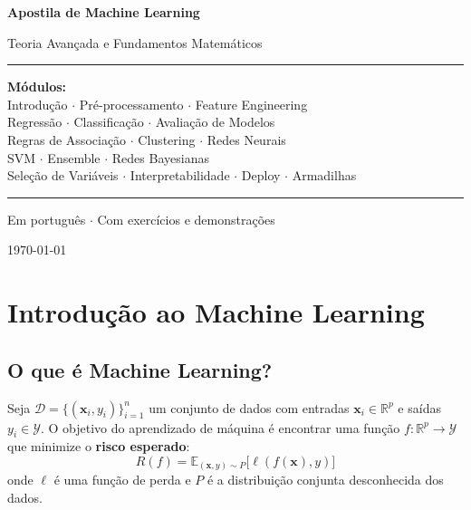 \documentclass[12pt,a4paper,twoside]{book}
\theoremstyle{definition}
\theoremstyle{remark}
\newcommand{\R}{\mathbb{R}}
\newcommand{\E}{\mathbb{E}}
\newcommand{\D}{\mathcal{D}}
\newcommand{\bx}{\bm{x}}
\begin{document}
\begin{titlepage}
\centering
\vspace*{2cm}
{\Huge\bfseries Apostila de Machine Learning\par}
\vspace{0.5cm}
{\LARGE Teoria Avançada e Fundamentos Matemáticos\par}
\vspace{2cm}
\rule{\linewidth}{0.5pt}
\vspace{0.5cm}

{\large
\textbf{Módulos:}\\[6pt]
Introdução $\cdot$ Pré-processamento $\cdot$ Feature Engineering\\
Regressão $\cdot$ Classificação $\cdot$ Avaliação de Modelos\\
Regras de Associação $\cdot$ Clustering $\cdot$ Redes Neurais\\
SVM $\cdot$ Ensemble $\cdot$ Redes Bayesianas\\
Seleção de Variáveis $\cdot$ Interpretabilidade $\cdot$ Deploy $\cdot$ Armadilhas
}

\vspace{0.5cm}
\rule{\linewidth}{0.5pt}
\vfill
{\large Em português $\cdot$ Com exercícios e demonstrações\par}
\vspace{1cm}
{\large \today\par}
\end{titlepage}

\frontmatter
\tableofcontents
\listoffigures
\listoftables

\mainmatter

\chapter{Introdução ao Machine Learning}

\section{O que é Machine Learning?}

\begin{tcolorbox}[defbox,title=Definição Formal]
Seja $\D = \{(\bx_i, y_i)\}_{i=1}^n$ um conjunto de dados com entradas $\bx_i \in \R^p$ e saídas $y_i \in \mathcal{Y}$. O objetivo do aprendizado de máquina é encontrar uma função $f: \R^p \to \mathcal{Y}$ que minimize o \textbf{risco esperado}:
\[
R(f) = \E_{(\bx,y) \sim P}\bigl[\ell(f(\bx), y)\bigr]
\]
onde $\ell$ é uma função de perda e $P$ é a distribuição conjunta desconhecida dos dados.
\end{tcolorbox}
\end{document}
